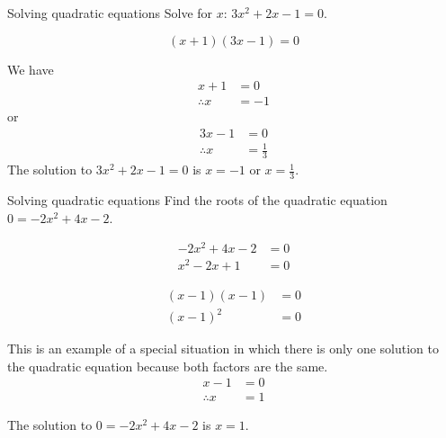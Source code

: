 
        
\begin{wex}
{Solving quadratic equations }
{Solve for $x$: $3{x}^{2}+2x-1=0$.}
{

\begin{equation*}
  (x+1)(3x-1)=0
\end{equation*}

We have
\begin{align*}
  x+1 &= 0 \\
  \therefore x &= -1
\end{align*}
or
\begin{align*}
  3x-1 &= 0 \\
  \therefore x &= \frac{1}{3}
\end{align*}
The solution to $3{x}^{2}+2x-1=0$ is $x=-1$ or $x=\frac{1}{3}$.
}
\end{wex}


\begin{wex}{ Solving quadratic equations }
{Find the roots of the quadratic equation  $0=-2{x}^{2}+4x-2$.}
{
\begin{align*}
  -2{x}^{2}+4x-2 &= 0 \\
  {x}^{2}-2x+1 &= 0
\end{align*}


\begin{align*}
  (x-1)(x-1) &= 0 \\
  (x-1)^{2} &= 0
\end{align*}

This is an example of a special situation in which there is only one solution to the quadratic equation because both factors are the same.
\begin{align*}
  x -1 &=  0 \\
  \therefore x & = 1
\end{align*}

 
The solution to $0=-2{x}^{2}+4x-2$ is $x=1$.
}
\end{wex}


